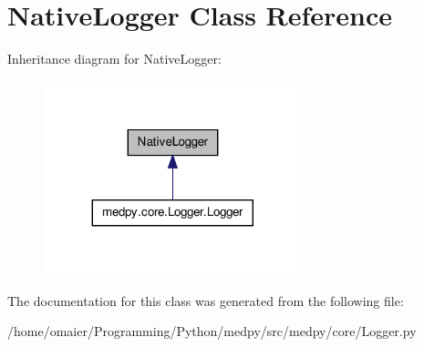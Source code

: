 \hypertarget{classNativeLogger}{
\section{NativeLogger Class Reference}
\label{classNativeLogger}
}


Inheritance diagram for NativeLogger:\nopagebreak
\begin{figure}[H]
\begin{center}
\leavevmode
\includegraphics[width=212pt]{classNativeLogger__inherit__graph}
\end{center}
\end{figure}


The documentation for this class was generated from the following file:\begin{DoxyCompactItemize}
\item 
/home/omaier/Programming/Python/medpy/src/medpy/core/Logger.py\end{DoxyCompactItemize}
